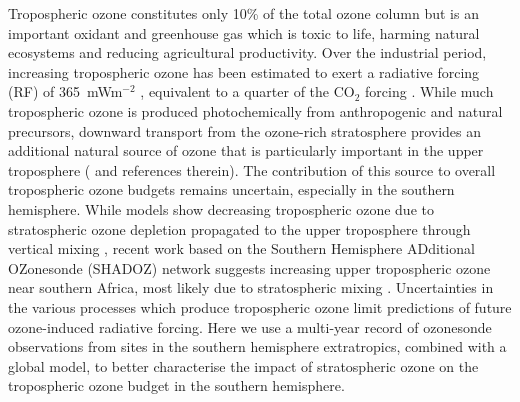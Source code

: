 
Tropospheric ozone constitutes only 10\% of the total ozone column but is an important oxidant and greenhouse gas which is toxic to life, harming natural ecosystems and reducing agricultural productivity.
Over the industrial period, increasing tropospheric ozone has been estimated to exert a radiative forcing (RF) of 365~mWm$^{-2}$  \citep{Stevenson2013}, equivalent to a quarter of the CO$_2$ forcing \citep{IPCC_Chapter2}. 
While much tropospheric ozone is produced photochemically from anthropogenic and natural precursors, %
downward transport from the ozone-rich stratosphere provides an additional natural source of ozone that is particularly important in the upper troposphere (\citet{Jacobson2000} and references therein).
The contribution of this source to overall tropospheric ozone budgets remains uncertain, especially in the southern hemisphere.
While models show decreasing tropospheric ozone due to stratospheric ozone depletion propagated to the upper troposphere through vertical mixing \citep{Stevenson2013}, recent work based on the Southern Hemisphere ADditional OZonesonde (SHADOZ) network suggests increasing upper tropospheric ozone near southern Africa, most likely due to stratospheric mixing \citep{Liu2015, Thompson2014}.
Uncertainties in the various processes which produce tropospheric ozone limit predictions of future ozone-induced radiative forcing.
Here we use a multi-year record of ozonesonde observations from sites in the southern hemisphere extratropics, combined with a global model, to better characterise the impact of stratospheric ozone on the tropospheric ozone budget in the southern hemisphere.

